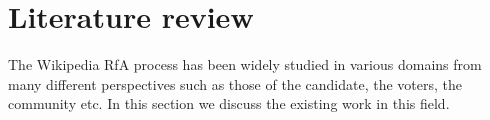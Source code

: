 \section{Literature review}
\label{sec:literature-review}

The Wikipedia RfA process has been widely studied in various domains from many different perspectives such as those of the candidate, the voters, the community etc. In this section we discuss the existing work in this field.

